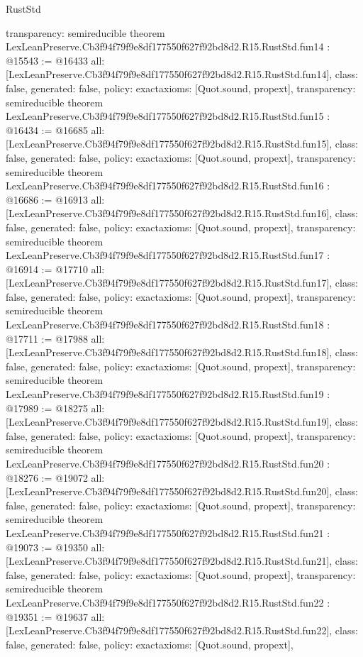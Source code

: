 \begin{lexlean}{RustStd}
\begin{coremodule}
{  transparency: semireducible
}
theorem LexLeanPreserve.Cb3f94f79f9e8df177550f627f92bd8d2.R15.RustStd.fun14 : @15543 := @16433 {
  all: [LexLeanPreserve.Cb3f94f79f9e8df177550f627f92bd8d2.R15.RustStd.fun14],
  class: false,
  generated: false,
  policy: exact{axioms: [Quot.sound, propext]},
  transparency: semireducible
}
theorem LexLeanPreserve.Cb3f94f79f9e8df177550f627f92bd8d2.R15.RustStd.fun15 : @16434 := @16685 {
  all: [LexLeanPreserve.Cb3f94f79f9e8df177550f627f92bd8d2.R15.RustStd.fun15],
  class: false,
  generated: false,
  policy: exact{axioms: [Quot.sound, propext]},
  transparency: semireducible
}
theorem LexLeanPreserve.Cb3f94f79f9e8df177550f627f92bd8d2.R15.RustStd.fun16 : @16686 := @16913 {
  all: [LexLeanPreserve.Cb3f94f79f9e8df177550f627f92bd8d2.R15.RustStd.fun16],
  class: false,
  generated: false,
  policy: exact{axioms: [Quot.sound, propext]},
  transparency: semireducible
}
theorem LexLeanPreserve.Cb3f94f79f9e8df177550f627f92bd8d2.R15.RustStd.fun17 : @16914 := @17710 {
  all: [LexLeanPreserve.Cb3f94f79f9e8df177550f627f92bd8d2.R15.RustStd.fun17],
  class: false,
  generated: false,
  policy: exact{axioms: [Quot.sound, propext]},
  transparency: semireducible
}
theorem LexLeanPreserve.Cb3f94f79f9e8df177550f627f92bd8d2.R15.RustStd.fun18 : @17711 := @17988 {
  all: [LexLeanPreserve.Cb3f94f79f9e8df177550f627f92bd8d2.R15.RustStd.fun18],
  class: false,
  generated: false,
  policy: exact{axioms: [Quot.sound, propext]},
  transparency: semireducible
}
theorem LexLeanPreserve.Cb3f94f79f9e8df177550f627f92bd8d2.R15.RustStd.fun19 : @17989 := @18275 {
  all: [LexLeanPreserve.Cb3f94f79f9e8df177550f627f92bd8d2.R15.RustStd.fun19],
  class: false,
  generated: false,
  policy: exact{axioms: [Quot.sound, propext]},
  transparency: semireducible
}
theorem LexLeanPreserve.Cb3f94f79f9e8df177550f627f92bd8d2.R15.RustStd.fun20 : @18276 := @19072 {
  all: [LexLeanPreserve.Cb3f94f79f9e8df177550f627f92bd8d2.R15.RustStd.fun20],
  class: false,
  generated: false,
  policy: exact{axioms: [Quot.sound, propext]},
  transparency: semireducible
}
theorem LexLeanPreserve.Cb3f94f79f9e8df177550f627f92bd8d2.R15.RustStd.fun21 : @19073 := @19350 {
  all: [LexLeanPreserve.Cb3f94f79f9e8df177550f627f92bd8d2.R15.RustStd.fun21],
  class: false,
  generated: false,
  policy: exact{axioms: [Quot.sound, propext]},
  transparency: semireducible
}
theorem LexLeanPreserve.Cb3f94f79f9e8df177550f627f92bd8d2.R15.RustStd.fun22 : @19351 := @19637 {
  all: [LexLeanPreserve.Cb3f94f79f9e8df177550f627f92bd8d2.R15.RustStd.fun22],
  class: false,
  generated: false,
  policy: exact{axioms: [Quot.sound, propext]},
}
\end{coremodule}
\end{lexlean}
